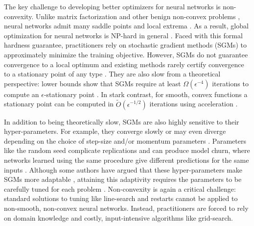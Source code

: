 The key challenge to developing better optimizers for neural networks is
non-convexity.
Unlike matrix factorization and other benign non-convex problems
\citep{burer2005low}, neural networks admit many saddle points and
local extrema \citep{safran2018local, dauphin2014saddles}.
As a result, global optimization for neural networks is NP-hard in general
\citep{froese2023hard, blum1988complete}.
Faced with this formal hardness guarantee, practitioners rely on stochastic
gradient methods (SGMs) to approximately minimize the training objective.
However, SGMs do not guarantee convergence to a local optimum \citep{ge2015escaping}
and existing methods rarely certify convergence to a stationary point of any
type \citep{goodfellow2016deeplearning}.
They are also slow from a theoretical perspective:
lower bounds show that SGMs require at least \( \Omega(\epsilon^{-4}) \) iterations
to compute an \( \epsilon \)-stationary point \citep{arjevani2023lower, drori2020complexity}.
In stark contrast, for smooth, convex functions a stationary point can be
computed in \( \tilde{O}(\epsilon^{-1/2}) \) iterations using acceleration
\citep{nesterov2018lectures}.

In addition to being theoretically slow, SGMs are also highly sensitive to
their hyper-parameters.
For example, they converge slowly or may even diverge depending on the choice
of step-size and/or momentum parameters \citep{zhang2022adam}.
Parameters like the random seed complicate replications and can produce model
churn, where networks learned using the same procedure give different
predictions for the same inputs \citep{henderson2018deep,
    bhojanapalli2021reproducibility}.
Although some authors have argued that these hyper-parameters make
SGMs more adaptable \citep{choi2019empirical}, attaining this adaptivity
requires the parameters to be carefully tuned for each problem
\citep{sivaprasad2020tuning}.
Non-convexity is again a critical challenge:
standard solutions to tuning like line-search
\citep{armijo1966ls} and restarts \citep{odonoghue2015restarts} cannot be
applied to non-smooth, non-convex neural networks.
Instead, practitioners are forced to rely on domain knowledge and costly,
input-intensive algorithms like grid-search.

